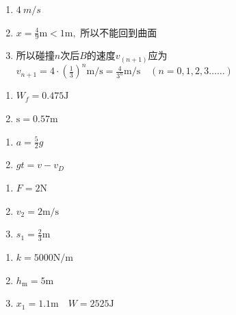 \item \begin {enumerate} \renewcommand {\labelenumi }{\arabic {enumi}.} \item $ 4 \ m/s $ \item $x=\frac {4}{9} \mathrm {m}<1 \mathrm {m},$ 所以不能回到曲面 \par \item 所以碰撞$ n $次后$ B $的速度$v_{(n+1)}$应为 $v_{n+1}=4 \cdot \left (\frac {1}{3}\right )^{n} \mathrm {m} / \mathrm {s}=\frac {4}{3^{n}} \mathrm {m} / \mathrm {s} \quad (n=0,1,2,3 \ldots \ldots )$ \end {enumerate} \par \par 
\item \begin {enumerate} \renewcommand {\labelenumi }{\arabic {enumi}.} \item $W_{f}=0.475 \mathrm {J}$ \item $\mathrm {s}=0.57 \mathrm {m}$ \par \end {enumerate} \par \par 
\item \begin {enumerate} \renewcommand {\labelenumi }{\arabic {enumi}.} \item $a=\frac {5}{2} g$ \item $g t=v-v_{D}$ \par \end {enumerate} \par \par 
\item \begin {enumerate} \renewcommand {\labelenumi }{\arabic {enumi}.} \item $F=2 \mathrm {N}$ \item $v_{2}=2 \mathrm {m} / \mathrm {s}$ \item $s_{1}=\frac {2}{3} \mathrm {m}$ \end {enumerate} \par \par 
\item \begin {enumerate} \renewcommand {\labelenumi }{\arabic {enumi}.} \item $k=5000 \mathrm {N} / \mathrm {m}$ \item $h_{\mathrm {m}}=5 \mathrm {m}$ \item $x_{1}=1.1 \mathrm {m} \quad W=2525 \mathrm {J}$ \par \par \par \end {enumerate} \par \par 

